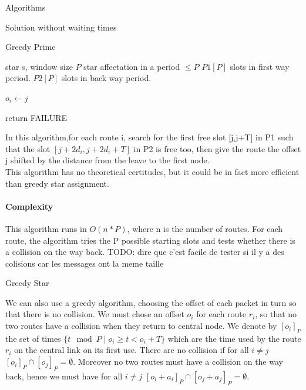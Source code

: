 \documentclass[a4paper,10pt]{report}
\newcommand{\todo}[1]{}
\renewcommand{\todo}[1]{{\color{red} TODO: {#1}}}
\begin{document}
\begin{chapter}{Algorithms}
\begin{section}{Solution without waiting times}
\begin{subsection}{Greedy Prime}
\begin{algorithm}[H]
\caption{Greedy Prime assignment}
\begin{algorithmic}
\REQUIRE star s, window size $P$
\ENSURE star affectation in a period $\leq P$ 
\STATE $P1[P]$ slots in first way period.
\STATE $P2[P]$ slots in back way period.




\STATE $o_i \leftarrow j$
\ENDIF

\ENDIF
{}
\STATE return FAILURE
\ENDIF
\ENDFOR

\ENDFOR

\end{algorithmic}
\end{algorithm}


In this algorithm,for each route i, search for the first free slot [j,j+T] in P1 such that the slot $[j + 2d_i,j + 2d_i+T]$ in P2 is free too,
then give the route the offset j shifted by the distance from the leave to the first node.\\
This algorithm has no theoretical certitudes, but it could be in fact more efficient than greedy star assignment.


\paragraph{Complexity}
This algorithm runs in $O(n*P)$, where n is the number of routes. For each route, the algorithm tries the P possible
starting slots and tests whether there is a collision on the way back.
\todo{dire que c'est facile de tester si il y a des colisions car les messages ont la meme taille}

\end{subsection}




\begin{subsection}{Greedy Star}
 

We can also use a greedy algorithm, choosing the offset of each packet in turn so that there is no collision. 
We must chose an offset $o_i$ for each route $r_i$, so that no two routes have a collision when they return to central node.  
We denote by $[o_i]_P$ the set of times $\{ t \mod P \mid o_i \geq t < o_i + T \}$ which are the time used by the route $r_i$ on the central
link on its first use. There are no collision if for all $i\neq j$
 $[o_i]_P \cap [o_j]_P = \emptyset$. Moreover no two routes must have a collision on the way back, hence we must have for all $i\neq j$
 $[o_i + a_i]_P \cap [o_j + a_j]_P = \emptyset$.
 

\end{subsection}
\end{section}
\end{chapter}
\end{document}
